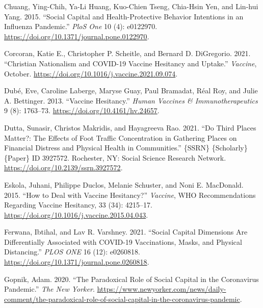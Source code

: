 \documentclass[
]{article}
\newlength{\cslhangindent}
\newlength{\cslentryspacingunit} %
\newenvironment{CSLReferences}[2] %
 {%
  \setlength{\parindent}{0pt}
  \ifodd #1
  \let\oldpar\par
  \def\par{\hangindent=\cslhangindent\oldpar}
  \fi
  \setlength{\parskip}{#2\cslentryspacingunit}
 }%
 {}
\begin{document}
\begin{CSLReferences}{1}{0}
\leavevmode{}%
Chuang, Ying-Chih, Ya-Li Huang, Kuo-Chien Tseng, Chia-Hsin Yen, and
Lin-hui Yang. 2015. {``Social Capital and Health-Protective Behavior
Intentions in an Influenza Pandemic.''} \emph{PloS One} 10 (4):
e0122970. \url{https://doi.org/10.1371/journal.pone.0122970}.

\leavevmode{}%
Corcoran, Katie E., Christopher P. Scheitle, and Bernard D. DiGregorio.
2021. {``Christian {Nationalism} and {COVID}-19 {Vaccine} {Hesitancy}
and {Uptake}.''} \emph{Vaccine}, October.
\url{https://doi.org/10.1016/j.vaccine.2021.09.074}.

\leavevmode{}%
Dubé, Eve, Caroline Laberge, Maryse Guay, Paul Bramadat, Réal Roy, and
Julie A. Bettinger. 2013. {``Vaccine Hesitancy.''} \emph{Human Vaccines
\& Immunotherapeutics} 9 (8): 1763--73.
\url{https://doi.org/10.4161/hv.24657}.

\leavevmode{}%
Dutta, Sunasir, Christos Makridis, and Hayagreeva Rao. 2021. {``Do
{Third} {Places} {Matter}?: {The} {Effects} of {Foot} {Traffic}
{Concentration} in {Gathering} {Places} on {Financial} {Distress} and
{Physical} {Health} in {Communities}.''} \{SSRN\} \{Scholarly\}
\{Paper\} ID 3927572. Rochester, NY: Social Science Research Network.
\url{https://doi.org/10.2139/ssrn.3927572}.

\leavevmode{}%
Eskola, Juhani, Philippe Duclos, Melanie Schuster, and Noni E.
MacDonald. 2015. {``How to Deal with Vaccine Hesitancy?''}
\emph{Vaccine}, {WHO} {Recommendations} {Regarding} {Vaccine}
{Hesitancy}, 33 (34): 4215--17.
\url{https://doi.org/10.1016/j.vaccine.2015.04.043}.

\leavevmode{}%
Ferwana, Ibtihal, and Lav R. Varshney. 2021. {``Social Capital
Dimensions Are Differentially Associated with {COVID}-19 Vaccinations,
Masks, and Physical Distancing.''} \emph{PLOS ONE} 16 (12): e0260818.
\url{https://doi.org/10.1371/journal.pone.0260818}.

\leavevmode{}%
Gopnik, Adam. 2020. {``The {Paradoxical} {Role} of {Social} {Capital} in
the {Coronavirus} {Pandemic}.''} \emph{The New Yorker}.
\url{https://www.newyorker.com/news/daily-comment/the-paradoxical-role-of-social-capital-in-the-coronavirus-pandemic}.


\end{CSLReferences}
\end{document}
